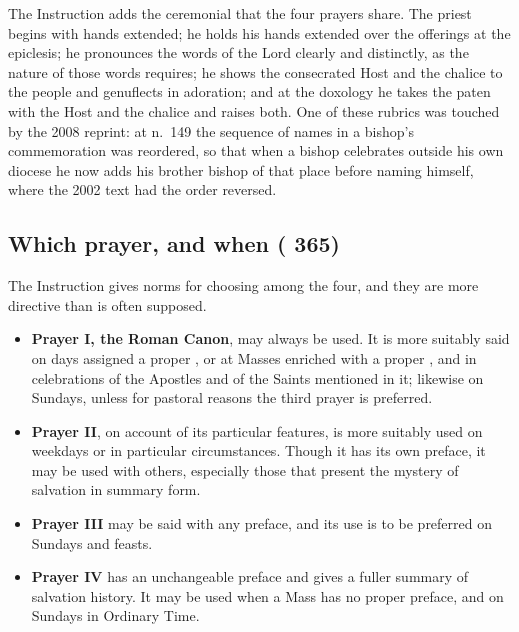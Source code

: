 The Instruction adds the ceremonial that the four prayers share. The priest begins with hands
extended; he holds his hands extended over the offerings at the epiclesis; he pronounces the
words of the Lord clearly and distinctly, as the nature of those words requires; he shows the
consecrated Host and the chalice to the people and genuflects in adoration; and at the doxology
he takes the paten with the Host and the chalice and raises both. One of these rubrics was
touched by the 2008 reprint: at  n.\ 149 the sequence of names in a
bishop's commemoration was reordered, so that when a bishop celebrates outside his own diocese
he now adds his brother bishop of that place before naming himself, where the 2002 text had the
order reversed.

\subsection{Which prayer, and when ( 365)}

The Instruction gives norms for choosing among the four, and they are more directive than is
often supposed.

\begin{itemize}
\item \textbf{Prayer I, the Roman Canon}, may always be used. It is more suitably said on days
assigned a proper , or at Masses enriched with a proper , and in celebrations of the Apostles and of the Saints mentioned in it; likewise on
Sundays, unless for pastoral reasons the third prayer is preferred.
\item \textbf{Prayer II}, on account of its particular features, is more suitably used on
weekdays or in particular circumstances. Though it has its own preface, it may be used with
others, especially those that present the mystery of salvation in summary form.
\item \textbf{Prayer III} may be said with any preface, and its use is to be preferred on
Sundays and feasts.
\item \textbf{Prayer IV} has an unchangeable preface and gives a fuller summary of salvation
history. It may be used when a Mass has no proper preface, and on Sundays in Ordinary
Time.
\end{itemize}

